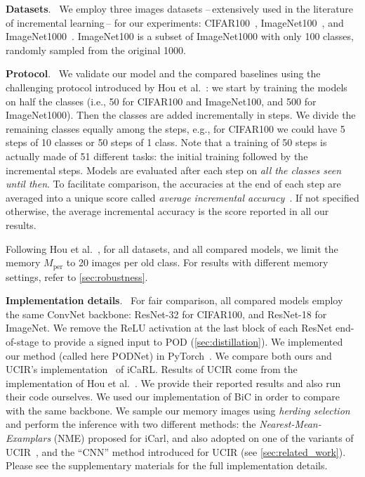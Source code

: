 \documentclass[runningheads]{llncs}
\newcommand{\parag}[1]{\vspace{0.2cm}\noindent\textbf{#1}.\ }
\begin{document}
\parag{Datasets} We employ three images datasets --\,extensively used in the literature of incremental learning\,-- for our experiments: CIFAR100~\cite{krizhevskycifar100}, ImageNet100~\cite{deng2009imagenet,hou2019ucir,wu2019bias_correction}, and ImageNet1000~\cite{deng2009imagenet}.
ImageNet100 is a subset of ImageNet1000 with only 100 classes, randomly sampled from the original 1000.



\parag{Protocol} We validate our model and the compared baselines using the challenging protocol introduced by Hou et al.~\cite{hou2019ucir}: we start by training the models on half the classes (i.e., 50 for CIFAR100 and ImageNet100, and 500 for ImageNet1000). Then the classes are added incrementally in steps. We divide the remaining classes equally among the steps, e.g., for CIFAR100 we could have 5 steps of 10 classes or 50 steps of 1 class. Note that a training of 50 steps is actually made of 51 different tasks: the initial training followed by the incremental steps. Models are evaluated after each step on \textit{all the classes seen until then}. To facilitate comparison, the accuracies at the end of each step are averaged into a unique score called \textit{average incremental accuracy}~\cite{rebuffi2017icarl}. If not specified otherwise, the average incremental accuracy is the score reported in all our results.



Following Hou et al.~\cite{hou2019ucir}, for all datasets, and all compared models, we limit the memory $M_\textrm{per}$ to 20 images per old class. For results with different memory settings, refer to \autoref{sec:robustness}.

\parag{Implementation details} For fair comparison, all compared models employ the same ConvNet backbone: ResNet-32 for CIFAR100, and ResNet-18 for ImageNet. We remove the ReLU activation at the last block of each ResNet end-of-stage to provide a signed input to POD (\autoref{sec:distillation}). We implemented our method (called here PODNet) in PyTorch~\cite{paszke2017pytorch}. 
We compare both ours and UCIR's implementation~\cite{hou2019ucir} of iCaRL. Results of UCIR come from the implementation of Hou et al.~\cite{hou2019ucir}. We provide their reported results and also run their code ourselves. We used our implementation of BiC in order to compare with the same backbone.
We sample our memory images using \textit{herding selection}~\cite{rebuffi2017icarl} and perform the inference with two different methods: the \textit{Nearest-Mean-Examplars} (NME) proposed for iCarl, and also adopted on one of the variants of UCIR~\cite{hou2019ucir}, and the ``CNN'' method introduced for UCIR (see \autoref{sec:related_work}).
Please see the supplementary materials for the full implementation details.
\end{document}
